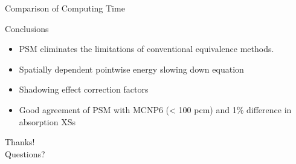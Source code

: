 \documentclass[sans,mathserif,aspectratio=169, 10pt]{beamer}
\begin{document}
\begin{frame}{Comparison of Computing Time}
\centering
{}
\end{frame}

\begin{frame}{Conclusions}
\begin{itemize}
\item PSM eliminates the limitations of conventional equivalence methods.
\item Spatially dependent pointwise energy slowing down equation
\item Shadowing effect correction factors
\item Good agreement of PSM with MCNP6 (< 100 pcm) and 1\% difference in absorption XSs
\end{itemize}
\end{frame}

\begin{frame}
\centering
\Huge
Thanks! \\
Questions?
\end{frame}
\end{document}
